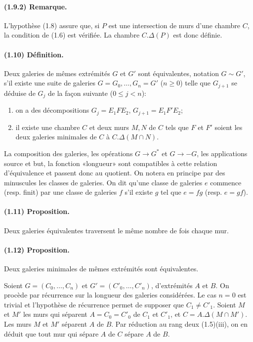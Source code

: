 \documentclass[10pt,a4paper]{article}
\begin{document}
\paragraph{(1.9.2) Remarque.} L'hypothèse (1.8) assure que, si $P$ est une intersection de murs d'une chambre $C$, la condition de (1.6) est vérifiée. La chambre $C.\Delta(P)$ est donc définie.

\paragraph{(1.10) Définition.} Deux galeries de mêmes extrémités $G$ et $G'$ sont équivalentes, notation $G\sim G'$, s'il existe une suite de galeries $G=G_0,\ldots,G_n=G'$ ($n\ge0$) telle que $G_{j+1}$ se déduise de $G_j$ de la façon suivante ($0\le j<n$):
\begin{enumerate}[label=\alph*)]
\item on a des décompositions $G_j=E_1FE_2$, $G_{j+1}=E_1F'E_2$;
\item il existe une chambre $C$ et deux murs $M,N$ de $C$ tels que $F$ et $F'$ soient les deux galeries minimales de $C$ à $C.\Delta(M\cap N)$.
\end{enumerate}
La composition des galeries, les opérations $G\to G^*$ et $G\to -G$, les applications source et but, la fonction «longueur» sont compatibles à cette relation d'équivalence et passent donc au quotient. On notera en principe par des minuscules les classes de galeries. On dit qu'une classe de galeries $e$ commence (resp. finit) par une classe de galeries $f$ s'il existe $g$ tel que $e=fg$ (resp. $e=gf$).

\paragraph{(1.11) Proposition.} Deux galeries équivalentes traversent le même nombre de fois chaque mur.

\paragraph{(1.12) Proposition.} Deux galeries minimales de mêmes extrémités sont équivalentes.

Soient $G=(C_0,\ldots,C_n)$ et $G'=(C'_0,\ldots,C'_n)$, d'extrémités $A$ et $B$. On procède par récurrence sur la longueur des galeries considérées. Le cas $n=0$ est trivial et l'hypothèse de récurrence permet de supposer que $C_1\ne C'_1$. Soient $M$ et $M'$ les murs qui séparent $A=C_0=C'_0$ de $C_1$ et $C'_1$, et $C=A.\Delta(M\cap M')$. Les murs $M$ et $M'$ séparent $A$ de $B$. Par réduction au rang deux (1.5)(iii), on en déduit que tout mur qui sépare $A$ de $C$ sépare $A$ de $B$.
\end{document}
